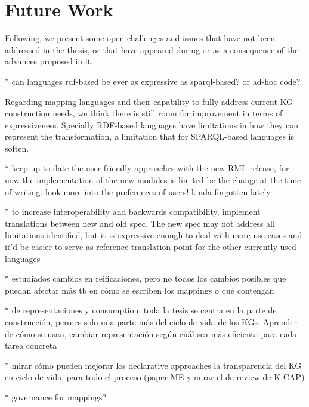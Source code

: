 \section{Future Work}
\label{sec:chp7_future-work}


Following, we present some open challenges and issues that have not been addressed in the thesis, or that have appeared during or as a consequence of the advances proposed in it. 

\textcolor{shamrockgreen}{* can languages rdf-based be ever as expressive as sparql-based? or ad-hoc code?}

Regarding mapping languages and their capability to fully address current KG construction needs, we think there is still room for improvement in terms of expressiveness. Specially RDF-based languages have limitations in how they can represent the transformation, a limitation that for SPARQL-based languages is soften. 

\textcolor{shamrockgreen}{* keep up to date the user-friendly approaches with the new RML release, for now the implementation of the new modules is limited bc the change at the time of writing. look more into the preferences of users! kinda forgotten lately}

\textcolor{shamrockgreen}{* to increase interoperability and backwards compatibility, implement translations between new and old spec. The new spec may not address all limitations identified, but it is expressive enough to deal with more use cases and it'd be easier to serve as reference translation point for the other currently used languages}

\textcolor{shamrockgreen}{* estudiados cambios en reificaciones, pero no todos los cambios posibles que puedan afectar más tb en cómo se escriben los mappings o qué contengan}

\textcolor{shamrockgreen}{* de representaciones y consumption. toda la tesis se centra en la parte de construcción, pero es solo una parte más del ciclo de vida de los KGs. Aprender de cómo se usan, cambiar representación según cuál sea más eficienta para cada tarea concreta}

\textcolor{shamrockgreen}{* mirar cómo pueden mejorar los declarative approaches la transparencia del KG en ciclo de vida, para todo el proceso (paper ME y mirar el de review de K-CAP)}

\textcolor{shamrockgreen}{* governance for mappings?}

